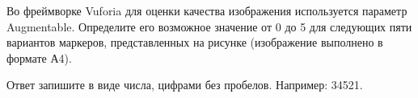 
Во фреймворке Vuforia для оценки качества изображения используется параметр Augmentable. Определите его возможное значение от 0 до 5 для следующих пяти вариантов маркеров, представленных на рисунке (изображение выполнено в формате А4).


Ответ запишите в виде числа, цифрами без пробелов. Например: 34521.